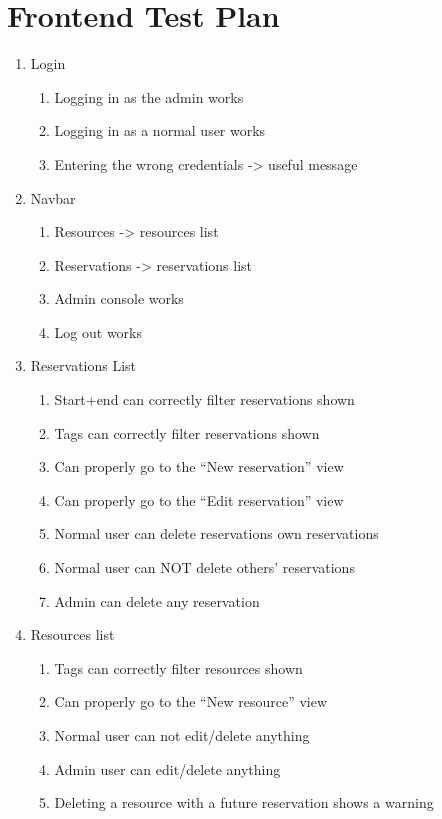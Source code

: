 \documentclass[12pt]{article}
\begin{document}
\clearpage
\section{Frontend Test Plan}
\label{appendix:frontendtest}
\begin{enumerate}
	\item Login
	\begin{enumerate}
		\item Logging in as the admin works
		\item Logging in as a normal user works
		\item Entering the wrong credentials -> useful message
	\end{enumerate}
	\item Navbar
	\begin{enumerate}
		\item Resources -> resources list
		\item Reservations -> reservations list
		\item Admin console works
		\item Log out works
	\end{enumerate}
	\item Reservations List
	\begin{enumerate}
		\item Start+end can correctly filter reservations shown
		\item Tags can correctly filter reservations shown
		\item Can properly go to the ``New reservation'' view
		\item Can properly go to the ``Edit reservation'' view
		\item Normal user can delete reservations own reservations
		\item Normal user can NOT delete others' reservations
		\item Admin can delete any reservation
	\end{enumerate}
	\item Resources list
	\begin{enumerate}
		\item Tags can correctly filter resources shown
		\item Can properly go to the ``New resource'' view
		\item Normal user can not edit/delete anything
		\item Admin user can edit/delete anything
		\item Deleting a resource with a future reservation shows a warning

\end{enumerate}
\end{enumerate}
\end{document}

